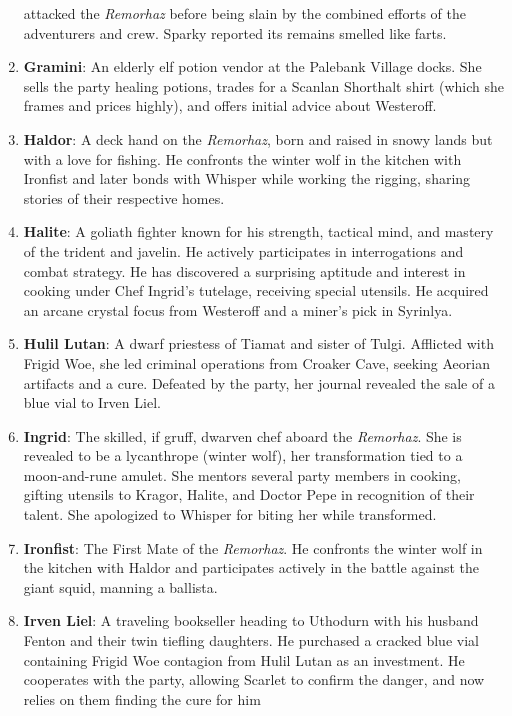 \documentclass[
  letterpaper,12pt,twoside,twocolumn,openany,
  nodeprecatedcode,bg=full]{dndbook}
\begin{document}
\begin{enumerate}
  attacked the \emph{Remorhaz} before being slain by the combined
  efforts of the adventurers and crew. Sparky reported its remains
  smelled like farts.
\item
  \textbf{Gramini}: An elderly elf potion vendor at the Palebank Village
  docks. She sells the party healing potions, trades for a Scanlan
  Shorthalt shirt (which she frames and prices highly), and offers
  initial advice about Westeroff.
\item
  \textbf{Haldor}: A deck hand on the \emph{Remorhaz}, born and raised
  in snowy lands but with a love for fishing. He confronts the winter
  wolf in the kitchen with Ironfist and later bonds with Whisper while
  working the rigging, sharing stories of their respective homes.
\item
  \textbf{Halite}: A goliath fighter known for his strength, tactical
  mind, and mastery of the trident and javelin. He actively participates
  in interrogations and combat strategy. He has discovered a surprising
  aptitude and interest in cooking under Chef Ingrid's tutelage,
  receiving special utensils. He acquired an arcane crystal focus from
  Westeroff and a miner's pick in Syrinlya.
\item
  \textbf{Hulil Lutan}: A dwarf priestess of Tiamat and sister of Tulgi.
  Afflicted with Frigid Woe, she led criminal operations from Croaker
  Cave, seeking Aeorian artifacts and a cure. Defeated by the party, her
  journal revealed the sale of a blue vial to Irven Liel.
\item
  \textbf{Ingrid}: The skilled, if gruff, dwarven chef aboard the
  \emph{Remorhaz}. She is revealed to be a lycanthrope (winter wolf),
  her transformation tied to a moon-and-rune amulet. She mentors several
  party members in cooking, gifting utensils to Kragor, Halite, and
  Doctor Pepe in recognition of their talent. She apologized to Whisper
  for biting her while transformed.
\item
  \textbf{Ironfist}: The First Mate of the \emph{Remorhaz}. He confronts
  the winter wolf in the kitchen with Haldor and participates actively
  in the battle against the giant squid, manning a ballista.
\item
  \textbf{Irven Liel}: A traveling bookseller heading to Uthodurn with
  his husband Fenton and their twin tiefling daughters. He purchased a
  cracked blue vial containing Frigid Woe contagion from Hulil Lutan as
  an investment. He cooperates with the party, allowing Scarlet to
  confirm the danger, and now relies on them finding the cure for him

\end{enumerate}
\end{document}
